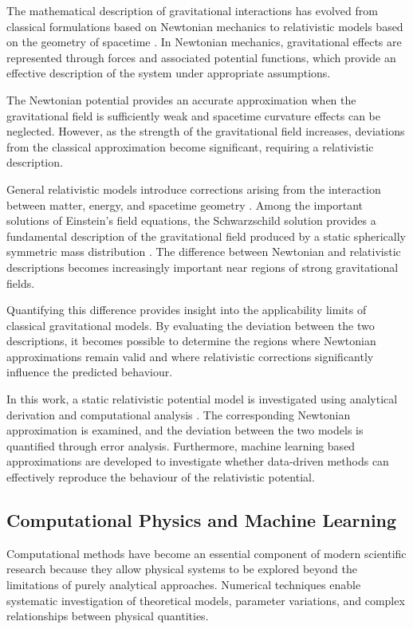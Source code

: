 \documentclass[
]{article}
\begin{document}
The mathematical description of gravitational interactions has evolved
from classical formulations based on Newtonian mechanics to relativistic
models based on the geometry of spacetime
\cite{newton1687, einstein1916}. In Newtonian mechanics, gravitational
effects are represented through forces and associated potential
functions, which provide an effective description of the system under
appropriate assumptions.

The Newtonian potential provides an accurate approximation when the
gravitational field is sufficiently weak and spacetime curvature effects
can be neglected. However, as the strength of the gravitational field
increases, deviations from the classical approximation become
significant, requiring a relativistic description.

General relativistic models introduce corrections arising from the
interaction between matter, energy, and spacetime geometry
\cite{einstein1916}. Among the important solutions of Einstein's field
equations, the Schwarzschild solution provides a fundamental description
of the gravitational field produced by a static spherically symmetric
mass distribution \cite{schwarzschild1916}. The difference between
Newtonian and relativistic descriptions becomes increasingly important
near regions of strong gravitational fields.

Quantifying this difference provides insight into the applicability
limits of classical gravitational models. By evaluating the deviation
between the two descriptions, it becomes possible to determine the
regions where Newtonian approximations remain valid and where
relativistic corrections significantly influence the predicted
behaviour.

In this work, a static relativistic potential model is investigated using
analytical derivation and computational analysis
\cite{schwarzschild1916}. The corresponding Newtonian approximation is
examined, and the deviation between the two models is quantified through
error analysis. Furthermore, machine learning based approximations are
developed to investigate whether data-driven methods can effectively
reproduce the behaviour of the relativistic potential.

\subsection{Computational Physics and Machine
Learning}\label{computational-physics-and-machine-learning}

Computational methods have become an essential component of modern
scientific research because they allow physical systems to be explored
beyond the limitations of purely analytical approaches. Numerical
techniques enable systematic investigation of theoretical models,
parameter variations, and complex relationships between physical
quantities.
\end{document}
